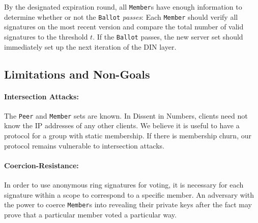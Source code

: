 By the designated expiration round, all \texttt{Member}s have enough
information to determine whether or not the \texttt{Ballot} \emph{passes}:
Each \texttt{Member} should verify all signatures on the most recent
version
and compare the total number of valid signatures to the threshold $t$. If the
\texttt{Ballot} passes, the new server set should immediately set up the
next iteration of the DIN layer.

\subsection{Limitations and Non-Goals}
  \paragraph{Intersection Attacks:} The \texttt{Peer} and \texttt{Member} sets are known. In Dissent in
    Numbers, clients need not know the IP addresses of any other clients. We
    believe it is useful to have a protocol for a group with static membership.
    If there is membership churn, our protocol remains vulnerable to
    intersection attacks.
  \paragraph{Coercion-Resistance:} In order to use anonymous ring signatures for voting, it is necessary
    for each signature within a scope to correspond to a specific member. An
    adversary with the power to coerce \texttt{Member}s into revealing their
    private keys after the fact may prove that a particular member voted a
    particular way\cite{lrs}.
